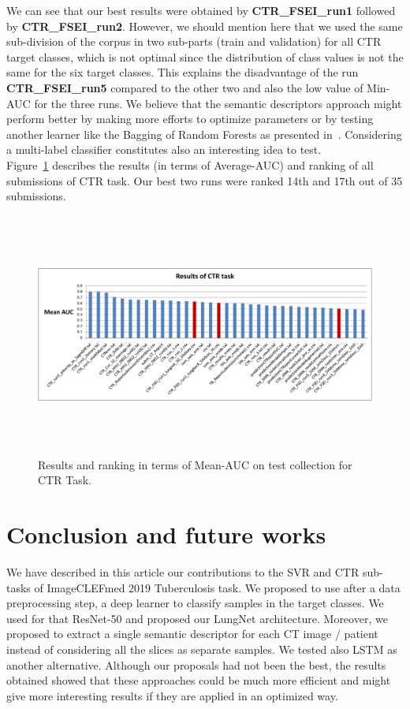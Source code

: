 \documentclass{llncs}
\begin{document}
We can see that our best results were obtained by  \textbf{CTR\_FSEI\_run1} followed by  \textbf{CTR\_FSEI\_run2}. However, we should mention here that we used the same sub-division of the corpus in two sub-parts (train and validation) for all CTR target classes, which is not optimal since the distribution of class values is not the same for the six target classes. This explains the disadvantage of the run \textbf{CTR\_FSEI\_run5} compared to the other two and also the low value of Min-AUC for the three runs. We believe that the semantic descriptors approach might perform better by making more efforts to optimize parameters or by testing another learner like the Bagging of Random Forests as presented in~\cite{HamadiY18}. Considering a multi-label classifier constitutes also an interesting idea to test.\\

Figure~\ref{fig:ctrresultsauc} describes the results (in terms of Average-AUC) and ranking of all submissions of CTR task. Our best two runs were ranked 14th and 17th out of 35 submissions.\\

\begin{figure}[!ht]
\includegraphics[width=12cm,height=8cm]{results_ctr_test_meanauc.pdf}
\caption{Results and ranking in terms of Mean-AUC on test collection for CTR Task.} 
\label{fig:ctrresultsauc}
\end{figure}



\section{Conclusion and future works}

We have described in this article our contributions to the SVR and CTR sub-tasks of ImageCLEFmed 2019 Tuberculosis task. We proposed to use after a data preprocessing step, a deep learner to classify samples in the target classes. We used for that ResNet-50 and proposed our LungNet architecture. Moreover, we proposed to extract a single semantic descriptor for each CT image / patient instead of considering all the slices as separate samples. We tested also LSTM as another alternative. Although our proposals had not been the best, the results obtained showed that these approaches could be much more efficient and might give more interesting results if they are applied in an optimized way.\\
\end{document}
